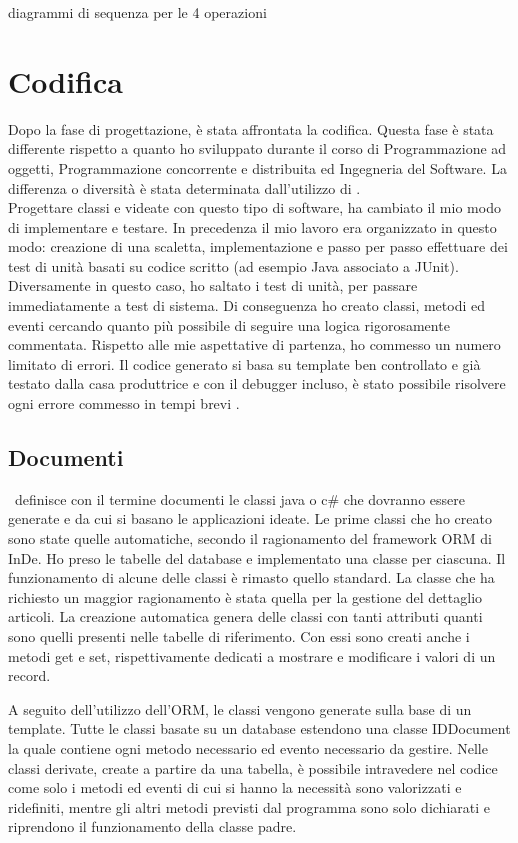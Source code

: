 \todo diagrammi di sequenza per le 4 operazioni


\section{Codifica}
Dopo la fase di progettazione, è stata affrontata la codifica. Questa fase è stata differente rispetto a quanto ho sviluppato durante il corso di Programmazione ad oggetti, Programmazione concorrente e distribuita ed Ingegneria del Software. La differenza o diversità è stata determinata dall'utilizzo di \inde.\\
Progettare classi e videate con questo tipo di software, ha cambiato il mio modo di implementare e testare. In precedenza il mio lavoro era organizzato in questo modo: creazione di una scaletta, implementazione e passo per passo effettuare dei test di unità basati su codice scritto (ad esempio Java associato a JUnit).\\
Diversamente in questo caso, ho saltato i test di unità, per passare immediatamente a test di sistema. Di conseguenza ho creato classi, metodi ed eventi cercando quanto più possibile di seguire una logica rigorosamente commentata. 
Rispetto alle mie aspettative di partenza, ho commesso un numero limitato di errori. Il codice generato si basa su template ben controllato e già testato dalla casa produttrice e con il debugger incluso, è stato possibile risolvere ogni errore commesso in tempi brevi  .


\subsection{Documenti}
\inde\ definisce con il termine documenti le classi java o c\# che dovranno essere generate e da cui si basano le applicazioni ideate.
Le prime classi che ho creato sono state quelle automatiche, secondo il ragionamento del framework ORM di InDe. Ho preso le tabelle del database e implementato una classe per ciascuna. Il funzionamento di alcune delle classi è rimasto quello standard. La classe che ha richiesto un  maggior ragionamento è stata quella per la gestione del dettaglio articoli.
La creazione automatica genera delle classi con tanti attributi quanti sono quelli presenti nelle tabelle di riferimento. Con essi sono creati anche i metodi get e set, rispettivamente dedicati a mostrare e modificare i valori di un record.

A seguito dell'utilizzo dell'ORM, le classi vengono generate sulla base di un template. Tutte le classi basate su un database estendono una classe IDDocument la quale contiene ogni metodo necessario ed evento necessario da gestire. Nelle classi derivate, create a partire da una tabella, è possibile intravedere nel codice come solo i metodi ed eventi di cui si hanno la necessità sono valorizzati e ridefiniti, mentre gli altri metodi previsti dal programma sono solo dichiarati e riprendono il funzionamento della classe padre.


